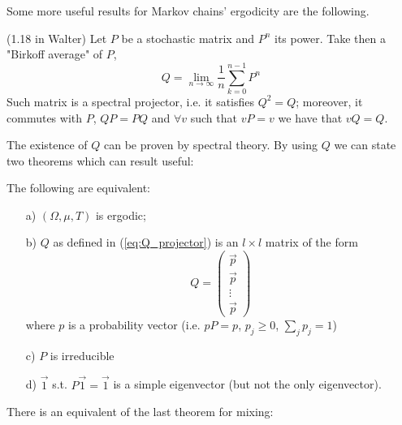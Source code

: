 Some more useful results for Markov chains' ergodicity are the following. 
\begin{lemma}{(1.18 in Walter)}
    Let $P$ be a stochastic matrix and $P^n$ its power. Take then a "Birkoff average" of $P$, 
    \begin{equation}
    \label{eq:Q_projector}
        Q = \lim_{n \rightarrow \infty} \frac{1}{n} \sum_{k=0}^{n-1} P^n
    \end{equation}
    Such matrix is a spectral projector, i.e. it satisfies $Q^2 = Q$; moreover, it commutes with $P$, $QP = PQ$ and $\forall v$ such that $vP = v$ we have that $vQ = Q$.
\end{lemma}
The existence of $Q$ can be proven by spectral theory. By using $Q$ we can state two theorems which can result useful:
\begin{theorem}
    The following are equivalent:
    \begin{itemize}
        \item[a)] $(\Omega, \mu, T)$ is ergodic;
        \item[b)] $Q$ as defined in (\ref{eq:Q_projector}) is an $l \times l$ matrix of the form 
        \begin{equation*}
            Q = 
            \begin{pmatrix}
                \Vec{p} \\
                \Vec{p} \\
                \vdots \\
                \Vec{p} 
            \end{pmatrix}
        \end{equation*}
        where $p$ is a probability vector (i.e. $pP = p$, $p_j \geq 0$, $\sum_j p_j = 1$)
        \item[c)] $P$ is irreducible
        \item[d)] $\Vec{1}$ s.t. $P \Vec{1} = \Vec{1}$ is a simple eigenvector (but not the only eigenvector).
    \end{itemize}
\end{theorem}
There is an equivalent of the last theorem for mixing:
